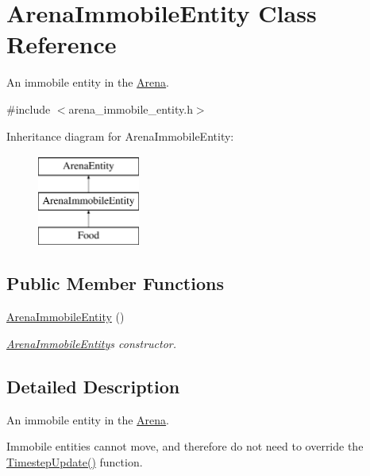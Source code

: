 \hypertarget{class_arena_immobile_entity}{}\section{Arena\+Immobile\+Entity Class Reference}
\label{class_arena_immobile_entity}


An immobile entity in the \hyperlink{class_arena}{Arena}.  




{\ttfamily \#include $<$arena\+\_\+immobile\+\_\+entity.\+h$>$}

Inheritance diagram for Arena\+Immobile\+Entity\+:\begin{figure}[H]
\begin{center}
\leavevmode
\includegraphics[height=3.000000cm]{class_arena_immobile_entity}
\end{center}
\end{figure}
\subsection*{Public Member Functions}
\begin{DoxyCompactItemize}
\item 
\hyperlink{class_arena_immobile_entity_ac24bb0af97a140d62dd52124489032fd}{Arena\+Immobile\+Entity} ()
\begin{DoxyCompactList}\small\item\em \hyperlink{class_arena_immobile_entity}{Arena\+Immobile\+Entity}\textquotesingle{}s constructor. \end{DoxyCompactList}\end{DoxyCompactItemize}


\subsection{Detailed Description}
An immobile entity in the \hyperlink{class_arena}{Arena}. 

Immobile entities cannot move, and therefore do not need to override the \hyperlink{class_arena_entity_a203613c40a5cecf47606b2a59adcc3bd}{Timestep\+Update()} function. 


